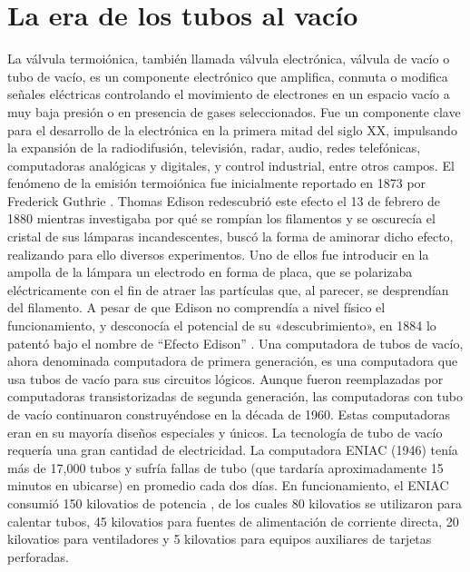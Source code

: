 \documentclass[]{article}
\begin{document}
\section{La era de los tubos al vacío}
La válvula termoiónica, también llamada válvula electrónica, válvula de vacío o tubo de vacío, es un componente electrónico que amplifica, conmuta o modifica señales eléctricas controlando el movimiento de electrones en un espacio vacío a muy baja presión o en presencia de gases seleccionados.
Fue un componente clave para el desarrollo de la electrónica en la primera mitad del siglo XX, impulsando la expansión de la radiodifusión, televisión, radar, audio, redes telefónicas, computadoras analógicas y digitales, y control industrial, entre otros campos.
El fenómeno de la emisión termoiónica fue inicialmente reportado en 1873 por Frederick Guthrie \cite{guthrie1876}. Thomas Edison redescubrió este efecto el 13 de febrero de 1880 mientras investigaba por qué se rompían los filamentos y se oscurecía el cristal de sus lámparas incandescentes, buscó la forma de aminorar dicho efecto, realizando para ello diversos experimentos. Uno de ellos fue introducir en la ampolla de la lámpara un electrodo en forma de placa, que se polarizaba eléctricamente con el fin de atraer las partículas que, al parecer, se desprendían del filamento. A pesar de que Edison no comprendía a nivel físico el funcionamiento, y desconocía el potencial de su «descubrimiento», en 1884 lo patentó bajo el nombre de ``Efecto Edison'' \cite{edison1884}.
Una computadora de tubos de vacío, ahora denominada computadora de primera generación, es una computadora que usa tubos de vacío para sus circuitos lógicos. Aunque fueron reemplazadas por computadoras transistorizadas de segunda generación, las computadoras con tubo de vacío continuaron construyéndose en la década de 1960. Estas computadoras eran en su mayoría diseños especiales y únicos.
La tecnología de tubo de vacío requería una gran cantidad de electricidad. La computadora ENIAC (1946) tenía más de 17,000 tubos y sufría fallas de tubo (que tardaría aproximadamente 15 minutos en ubicarse) en promedio cada dos días. En funcionamiento, el ENIAC consumió 150 kilovatios de potencia \cite{braun2014}, de los cuales 80 kilovatios se utilizaron para calentar tubos, 45 kilovatios para fuentes de alimentación de corriente directa, 20 kilovatios para ventiladores y 5 kilovatios para equipos auxiliares de tarjetas perforadas.
\end{document}
